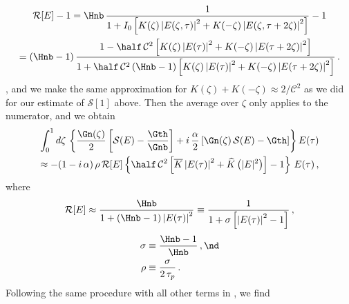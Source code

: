 \begin{multline}
    \mathcal{R}[E] - 1 = \Hnb\, \frac{1}{1 + I_0 \left[K(\zeta) \left|E(\zeta, \tau)\right|^2 + K(-\zeta) \left|E(\zeta, \tau + 2 \zeta)\right|^2\right]} - 1 \\
    = \left(\Hnb - 1\right) \frac{1 - \half\, \mathcal{C}^2 \left[K(\zeta) \left|E(\tau)\right|^2 + K(-\zeta) \left|E(\tau + 2 \zeta)\right|^2\right]}{1 + \half\, \mathcal{C}^2 \left(\Hnb - 1\right) \left[K(\zeta) \left|E(\tau)\right|^2 + K(-\zeta) \left|E(\tau + 2 \zeta)\right|^2\right]}\, .
\end{multline}
, and we make the same approximation for $K(\zeta) + K(-\zeta) \approx 2 / \mathcal{C}^2$ as we did for our estimate of $\mathcal{S}[1]$ above. Then the average over $\zeta$ only applies to the numerator, and we obtain
\begin{multline}
    \int_{0}^{1} d \zeta\, \left\{\frac{\Gn(\zeta)}{2} \left[ \mathcal{S}(E) - \frac{\Gth}{\Gnb}\right]
    + i\, \frac{\alpha}{2} \left[ \Gn(\zeta)\, \mathcal{S}(E) - \Gth \right] \right\}E(\tau) \\
    \approx - (1 - i\, \alpha)\, \rho\,  \mathcal{R}[E] \left\{\half\, \mathcal{C}^2 \left[\overline{K} \left|E(\tau)\right|^2 + \widehat{K}\left(|E|^2\right)\right] - 1\right\}\, E(\tau)\, ,
\end{multline}
where
\begin{equation}
    \mathcal{R}[E] \approx \frac{\Hnb}{1 + \left(\Hnb - 1\right) \left|E(\tau)\right|^2} \equiv \frac{1}{1 + \sigma \left[ \left|E(\tau)\right|^2 - 1 \right]}\, ,
\end{equation}
\begin{subequations}
    \begin{align}
        \label{eqn:mflt_sigma_def} \sigma &\equiv \frac{\Hnb - 1}{\Hnb}\, , \nd \\
        \label{eqn:mflt_rho_def} \rho &\equiv \frac{\sigma}{2\, \tau_p}\, .
    \end{align}
\end{subequations}
Following the same procedure with all other terms in , we find
